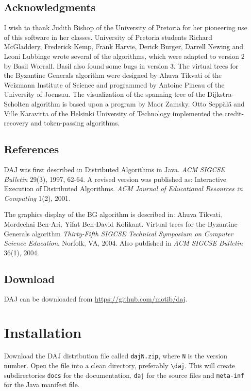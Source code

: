 \documentclass[11pt]{article}
\newcommand{\daj}{\textsc{DAJ}}
\newcommand{\p}[1]{\texttt{#1}}
\begin{document}
\subsection{Acknowledgments}
I wish to thank Judith Bishop of the University of Pretoria for
her pioneering use of this software in her classes. University
of Pretoria students Richard McGladdery, Frederick Kemp, Frank
Harvie, Derick Burger, Darrell Newing and Leoni Lubbinge wrote
several of the algorithms, which were adapted to version 2 by
Basil Worrall. Basil also found some bugs in version 3. The
virtual trees for the Byzantine Generals algorithm were designed
by Ahuva Tikvati of the Weizmann Institute of Science and
programmed by Antoine Pineau of the University of Joensuu. The
visualization of the spanning tree of the Dijkstra-Scholten
algorithm is based upon a program by Maor Zamsky.
Otto Sepp\"al\"a and Ville Karavirta of the Helsinki University
of Technology implemented the credit-recovery and token-passing
algorithms.

\subsection{References} \daj{} was first described in Distributed
Algorithms in Java. \emph{ACM SIGCSE Bulletin} 29(3), 1997, 62-64.
A revised version was published as: Interactive Execution of
Distributed Algorithms. \emph{ACM Journal of Educational
Resources in Computing} 1(2), 2001.

The graphics display of the BG algorithm is described in:
Ahuva Tikvati, Mordechai Ben-Ari, Yifat Ben-David Kolikant.
Virtual trees for the Byzantine Generals algorithm
\textit{Thirty-Fifth SIGCSE Technical Symposium on Computer Science Education}.
Norfolk, VA, 2004. Also published in \textit{ACM SIGCSE Bulletin} 36(1), 2004.

\subsection{Download}

\daj{} can be downloaded from \url{https://github.com/motib/daj}.

\section{Installation}

Download the \daj{} distribution file called \p{dajN.zip},
where \p{N} is the version number.
Open the file into a clean directory, preferably \verb=\=\p{daj}.
This will create subdirectories \p{docs} for the documentation,
\p{daj} for the source files and
\p{meta-inf} for the Java manifest file.
\end{document}
